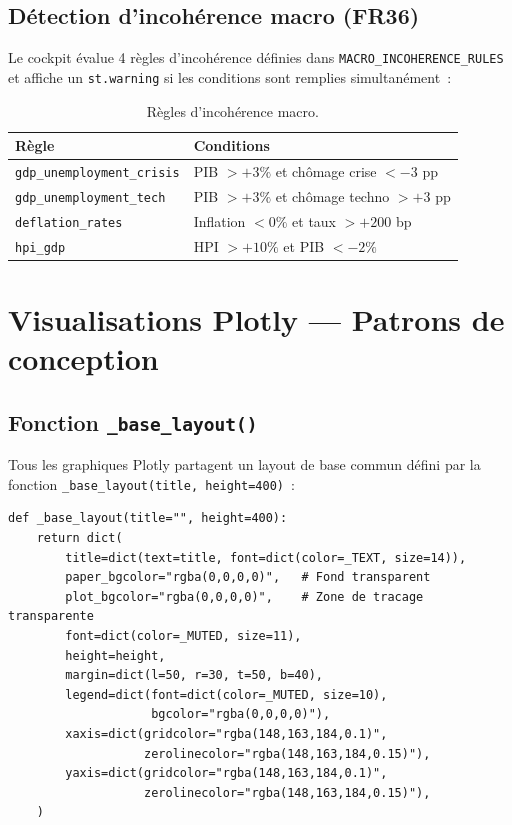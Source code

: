 \documentclass[12pt,a4paper]{article}
\begin{document}
\subsection{D\'etection d'incoh\'erence macro (FR36)}

Le cockpit \'evalue 4 r\`egles d'incoh\'erence d\'efinies dans \texttt{MACRO\_INCOHERENCE\_RULES} et affiche un \texttt{st.warning} si les conditions sont remplies simultan\'ement~:

\begin{table}[ht]
\centering
\caption{R\`egles d'incoh\'erence macro.}
\label{tab:incoherence}
\small
\begin{tabular}{@{}lp{8cm}@{}}
\toprule
\textbf{R\`egle} & \textbf{Conditions} \\
\midrule
\texttt{gdp\_unemployment\_crisis} & PIB $> +3\%$ et ch\^omage crise $< -3$ pp \\
\texttt{gdp\_unemployment\_tech} & PIB $> +3\%$ et ch\^omage techno $> +3$ pp \\
\texttt{deflation\_rates} & Inflation $< 0\%$ et taux $> +200$ bp \\
\texttt{hpi\_gdp} & HPI $> +10\%$ et PIB $< -2\%$ \\
\bottomrule
\end{tabular}
\end{table}


\section{Visualisations Plotly --- Patrons de conception}
\label{sec:plotly}

\subsection{Fonction \texttt{\_base\_layout()}}

Tous les graphiques Plotly partagent un layout de base commun d\'efini par la fonction \texttt{\_base\_layout(title, height=400)}~:

\begin{lstlisting}
def _base_layout(title="", height=400):
    return dict(
        title=dict(text=title, font=dict(color=_TEXT, size=14)),
        paper_bgcolor="rgba(0,0,0,0)",   # Fond transparent
        plot_bgcolor="rgba(0,0,0,0)",    # Zone de tracage transparente
        font=dict(color=_MUTED, size=11),
        height=height,
        margin=dict(l=50, r=30, t=50, b=40),
        legend=dict(font=dict(color=_MUTED, size=10),
                    bgcolor="rgba(0,0,0,0)"),
        xaxis=dict(gridcolor="rgba(148,163,184,0.1)",
                   zerolinecolor="rgba(148,163,184,0.15)"),
        yaxis=dict(gridcolor="rgba(148,163,184,0.1)",
                   zerolinecolor="rgba(148,163,184,0.15)"),
    )
\end{lstlisting}
\end{document}
